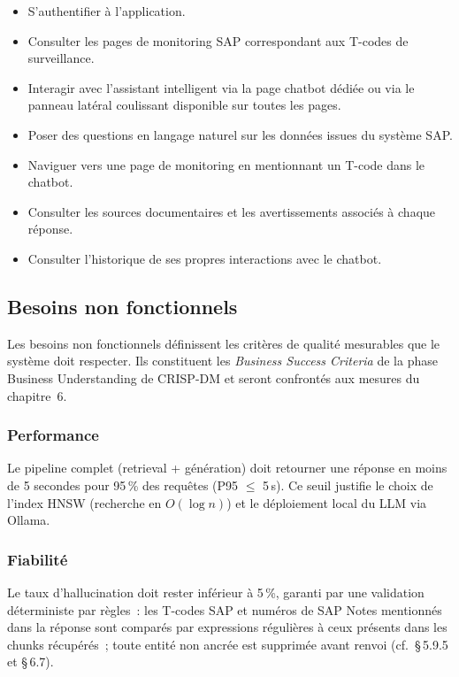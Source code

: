 \begin{itemize}
  \item S'authentifier à l'application.
  \item Consulter les pages de monitoring SAP correspondant aux T-codes de surveillance.
  \item Interagir avec l'assistant intelligent via la page chatbot dédiée ou via le panneau
        latéral coulissant disponible sur toutes les pages.
  \item Poser des questions en langage naturel sur les données issues du système SAP.
  \item Naviguer vers une page de monitoring en mentionnant un T-code dans le chatbot.
  \item Consulter les sources documentaires et les avertissements associés à chaque réponse.
  \item Consulter l'historique de ses propres interactions avec le chatbot.
\end{itemize}

\subsection{Besoins non fonctionnels}

Les besoins non fonctionnels définissent les critères de qualité mesurables que le système doit respecter. Ils constituent les \textit{Business Success Criteria} de la phase Business Understanding de CRISP-DM et seront confrontés aux mesures du chapitre~6.

\subsubsection{Performance}

Le pipeline complet (retrieval + génération) doit retourner une réponse en moins de 5 secondes pour 95\,\% des requêtes (P95 $\leq$ 5\,s). Ce seuil justifie le choix de l'index HNSW (recherche en $O(\log n)$) et le déploiement local du LLM via Ollama.

\subsubsection{Fiabilité}

Le taux d'hallucination doit rester inférieur à 5\,\%, garanti par une validation déterministe par règles~: les T-codes SAP et numéros de SAP Notes mentionnés dans la réponse sont comparés par expressions régulières à ceux présents dans les chunks récupérés~; toute entité non ancrée est supprimée avant renvoi (cf.\ §\,5.9.5 et §\,6.7).

